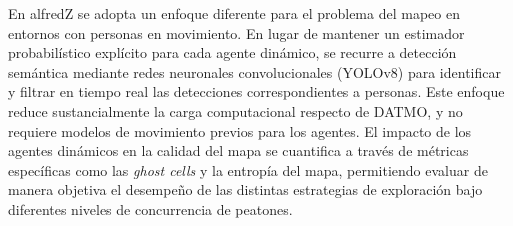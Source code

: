 En alfredZ se adopta un enfoque diferente para el problema del mapeo en
entornos con personas en movimiento. En lugar de mantener un estimador
probabilístico explícito para cada agente dinámico, se recurre a detección
semántica mediante redes neuronales convolucionales (YOLOv8) para identificar
y filtrar en tiempo real las detecciones correspondientes a personas. Este
enfoque reduce sustancialmente la carga computacional respecto de DATMO, y no
requiere modelos de movimiento previos para los agentes. El impacto de los
agentes dinámicos en la calidad del mapa se cuantifica a través de métricas
específicas como las \textit{ghost cells} y la entropía del mapa, permitiendo
evaluar de manera objetiva el desempeño de las distintas estrategias de
exploración bajo diferentes niveles de concurrencia de peatones.
